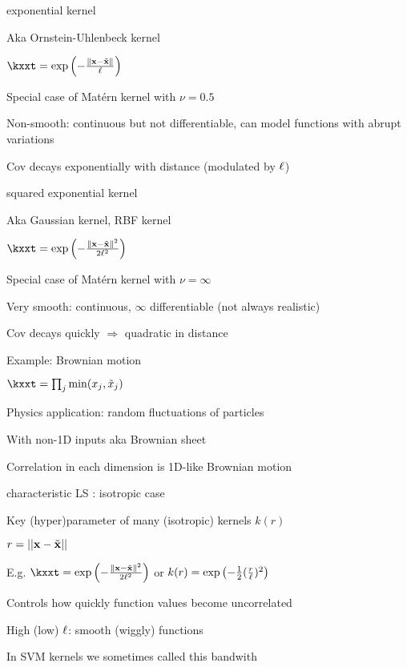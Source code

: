 \documentclass[11pt,compress,t,notes=noshow, xcolor=table]{beamer}
\begin{document}
\begin{framei}{exponential kernel}
\item Aka Ornstein-Uhlenbeck kernel
\item $\kxxt = \exp \left(-\frac{\xxtnorm}{\ls} \right)$
\item Special case of Matérn kernel with $\nu = 0.5$
\item Non-smooth: continuous but not differentiable, can model functions with abrupt variations
\item Cov decays exponentially with distance (modulated by $\ell$)
\end{framei}

\begin{framei}{squared exponential kernel}
\item Aka Gaussian kernel, RBF kernel
\item $\kxxt = \exp \left(-\frac{\xxtnorm^2}{2\ls^2} \right)$
\item Special case of Matérn kernel with $\nu = \infty$
\item Very smooth: continuous, $\infty$ differentiable (not always realistic)
\item Cov decays quickly $\Rightarrow$ quadratic in distance
\end{framei}

\begin{framei}[sep=S]{Example: Brownian motion}
\item $ \kxxt = \prod_j \min (x_j, \tilde{x}_j)$
\item Physics application: random fluctuations of particles
\item With non-1D inputs aka Brownian sheet
\item Correlation in each dimension is 1D-like Brownian motion
\vfill
{}
\end{framei}

\begin{framei}[sep=M]{characteristic LS : isotropic case}
\item Key (hyper)parameter of many (isotropic) kernels $k(r)$ 
\item $r=||\mathbf{x}-\tilde{\mathbf{x}}||$
\item E.g. $\kxxt = \exp \left(-\frac{\xxtnorm^2}{2\ls^2} \right)$ or $k(r) = \exp \left(-\frac{1}{2}(\frac{r}{\ell})^2\right)$ 
\item Controls how quickly function values become uncorrelated
\item High (low) $\ell$: smooth (wiggly) functions
\vfill
{}
\item In SVM kernels we sometimes called this bandwith
\end{framei}
\end{document}
